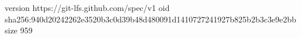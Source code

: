version https://git-lfs.github.com/spec/v1
oid sha256:940d20242262e3520b3c0d39b48d480091d1410727241927b825b2b3c3e9e2bb
size 959
